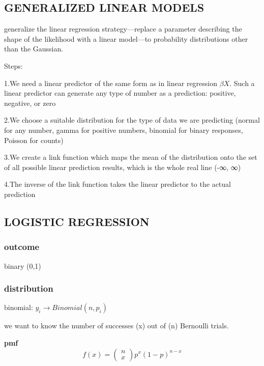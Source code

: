 \documentclass[
]{article}
\begin{document}
\hypertarget{generalized-linear-models}{%
\subsection{\texorpdfstring{\textbf{GENERALIZED LINEAR
MODELS}}{GENERALIZED LINEAR MODELS}}\label{generalized-linear-models}}

generalize the linear regression strategy---replace a parameter
describing the shape of the likelihood with a linear model---to
probability distributions other than the Gaussian.

Steps:

1.We need a linear predictor of the same form as in linear regression
\(\beta X\). Such a linear predictor can generate any type of number as
a prediction: positive, negative, or zero

2.We choose a suitable distribution for the type of data we are
predicting (normal for any number, gamma for positive numbers, binomial
for binary responses, Poisson for counts)

3.We create a link function which maps the mean of the distribution onto
the set of all possible linear prediction results, which is the whole
real line (-∞, ∞)

4.The inverse of the link function takes the linear predictor to the
actual prediction

\hypertarget{logistic-regression}{%
\subsection{LOGISTIC REGRESSION}\label{logistic-regression}}

\hypertarget{outcome-1}{%
\subsubsection{outcome}\label{outcome-1}}

binary (0,1)

\hypertarget{distribution-1}{%
\subsubsection{distribution}\label{distribution-1}}

binomial: \(y_i \to Binomial(n, p_i)\)

we want to know the number of successes (x) out of (n) Bernoulli trials.

\textbf{pmf}
\[f(x)= \begin{pmatrix} n\\x \end{pmatrix} p^x (1-p)^{n-x}\]
\end{document}
